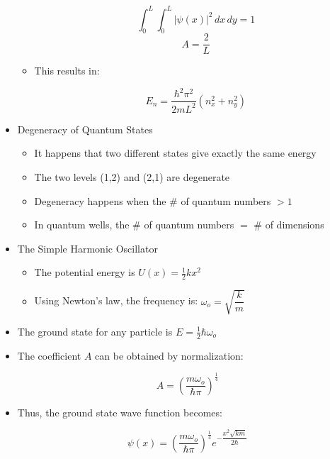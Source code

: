 \begin{itemize}
\begin{itemize}
          $$\int_0^L\int_0^L |\psi(x)|^2\,dx\,dy=1$$
          $$A=\frac{2}{L}$$

        \item This results in:

          $$E_n=\frac{\hbar^2\pi^2}{2mL^2}(n_x^2+n_y^2)$$

    \end{itemize}

  \item Degeneracy of Quantum States

    \begin{itemize}

      \item It happens that two different states give exactly the same energy

      \item The two levels (1,2) and (2,1) are degenerate

      \item Degeneracy happens when the \# of quantum numbers $>1$

      \item In quantum wells, the \# of quantum numbers $=$ \# of dimensions

    \end{itemize}

  \item The Simple Harmonic Oscillator

    \begin{itemize}

      \item The potential energy is $U(x)=\frac{1}{2}kx^2$

      \item Using Newton's law, the frequency is: $\omega_o=\sqrt{\dfrac{k}{m}}$

    \end{itemize}

  \item The ground state for any particle is $E=\frac{1}{2}\hbar\omega_o$

  \item The coefficient $A$ can be obtained by normalization: 

    $$A=\left( \dfrac{m\omega_o}{\hbar \pi} \right)^\frac{1}{4}$$

  \item Thus, the ground state wave function becomes:

    $$\boxed{\psi(x)=\left( \dfrac{m\omega_o}{\hbar\pi} \right)^{\frac{1}{4}}e^{-\dfrac{x^2\sqrt{km}}{2\hbar}}}$$

\end{itemize}



